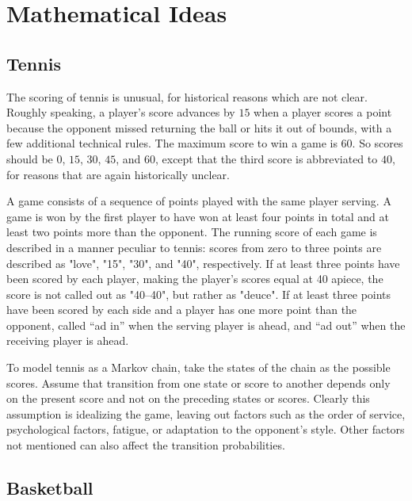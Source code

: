 \documentclass[12pt]{article}
\begin{document}
\hr

\section*{Mathematical Ideas}

\subsection*{Tennis}

The scoring of tennis is unusual, for historical reasons which are not
clear.  Roughly speaking, a player's  score advances
by $15$ when a player scores a point because the opponent missed
returning the ball or hits it out of bounds, with a few additional
technical rules.  The maximum score to
win a game is $60$.  So scores should be $0$, $15$, $30$, $45$, and $60$,
except that the third score is abbreviated to $40$, for reasons that
are again historically unclear.

A game consists of a sequence of points played with the same player
serving. A game is won by the first player to have won at least four
points in total and at least two points more than the opponent. The
running score of each game is described in a manner peculiar to
tennis: scores from zero to three points are described as "love",
"15", "30", and "40", respectively. If at least three points have been
scored by each player, making the player's scores equal at 40 apiece,
the score is not called out as "40–40", but rather as "deuce". If at
least three points have been scored by each side and a player has one
more point than the opponent, called ``ad in'' when the
serving player is ahead, and ``ad out''  when the receiving
player is ahead.

To model tennis as a Markov chain, take the states of the chain as the
possible scores.  Assume that transition from one state or score to
another depends only on the present score and not on the preceding
states or scores.  Clearly this assumption is idealizing the game,
leaving out factors such as the order of service, psychological
factors, fatigue, or adaptation to the opponent's style.  Other
factors not mentioned can also affect the transition probabilities.

\subsection*{Basketball}
\end{document}
